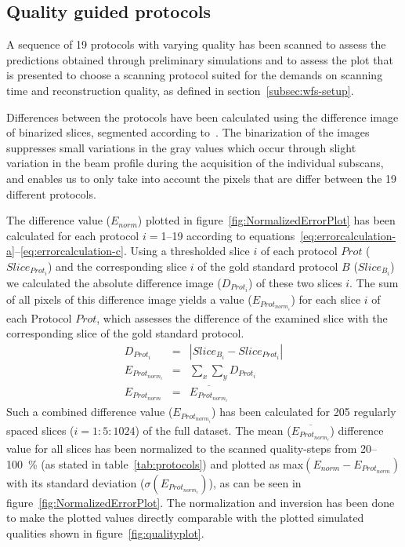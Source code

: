 \subsection{Quality guided protocols}
\cbstart
A sequence of 19 protocols with varying quality has been scanned to assess the predictions obtained through preliminary simulations and to assess the plot that is presented to choose a scanning protocol suited for the demands on scanning time and reconstruction quality, as defined in section~\ref{subsec:wfs-setup}.

Differences between the protocols have been calculated using the difference image of binarized slices, segmented according to~\citet{Otsu1979}. The binarization of the images suppresses small variations in the gray values which occur through slight variation in the beam profile during the acquisition of the individual subscans, and enables us to only take into account the pixels that are differ between the 19 different protocols.

The difference value ($E_{norm}$) plotted in figure~\ref{fig:NormalizedErrorPlot} has been calculated for each protocol $i=$1--19 according to equations~\ref{eq:errorcalculation-a}--\ref{eq:errorcalculation-c}. Using a thresholded slice $i$ of each protocol $Prot$ ($Slice_{Prot_{i}}$) and the corresponding slice $i$ of the gold standard protocol $B$ ($Slice_{B_{i}}$) we calculated the absolute difference image ($D_{Prot_{i}}$) of these two slices $i$. The sum of all pixels of this difference image yields a value (\(E_{Prot_{norm_{i}}}\)) for each slice $i$ of each Protocol $Prot$, which assesses the difference of the examined slice with the corresponding slice of the gold standard protocol. 
\begin{eqnarray}
       D_{Prot_{i}} &=& |Slice_{B_{i}}-Slice_{Prot_{i}}|\label{eq:errorcalculation-a}\\
E_{Prot_{norm_{i}}} &=& \sum_{x}\sum_{y} D_{Prot_{i}}\label{eq:errorcalculation-b}\\
    E_{Prot_{norm}} &=& \overline{E_{Prot_{norm_{i}}}}\label{eq:errorcalculation-c}
\end{eqnarray}
Such a combined difference value ($E_{Prot_{norm_{i}}}$) has been calculated for 205 regularly spaced slices ($i=1:5:1024$) of the full dataset. The mean ($\overline{E_{Prot_{norm_{i}}}}$) difference value for all slices has been normalized to the scanned quality-steps from 20--\SI{100}{\percent} (as stated in table~\ref{tab:protocols}) and plotted as max$(E_{norm}-E_{Prot_{norm}})$ with its standard deviation (\(\sigma(E_{Prot_{norm_{i}}})\)), as can be seen in figure~\ref{fig:NormalizedErrorPlot}. The normalization and inversion has been done to make the plotted values directly comparable with the plotted simulated qualities shown in figure~\ref{fig:qualityplot}.
\cbend

